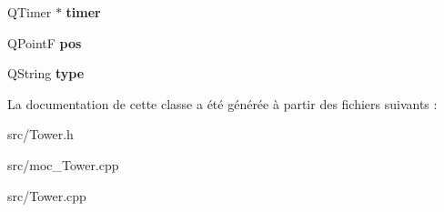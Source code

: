 \begin{DoxyCompactItemize}
\item 
\hypertarget{classTower_a7de2dee4f15ecea10d4945073ebde6f0}{
QTimer $\ast$ {\bfseries timer}}
\label{classTower_a7de2dee4f15ecea10d4945073ebde6f0}

\item 
\hypertarget{classTower_a2e31b99355d221706b6ec16459c4c0a1}{
QPointF {\bfseries pos}}
\label{classTower_a2e31b99355d221706b6ec16459c4c0a1}

\item 
\hypertarget{classTower_a94a20f8350f5f56015216ce4c81a41f7}{
QString {\bfseries type}}
\label{classTower_a94a20f8350f5f56015216ce4c81a41f7}

\end{DoxyCompactItemize}


La documentation de cette classe a été générée à partir des fichiers suivants :\begin{DoxyCompactItemize}
\item 
src/Tower.h\item 
src/moc\_\-Tower.cpp\item 
src/Tower.cpp\end{DoxyCompactItemize}
